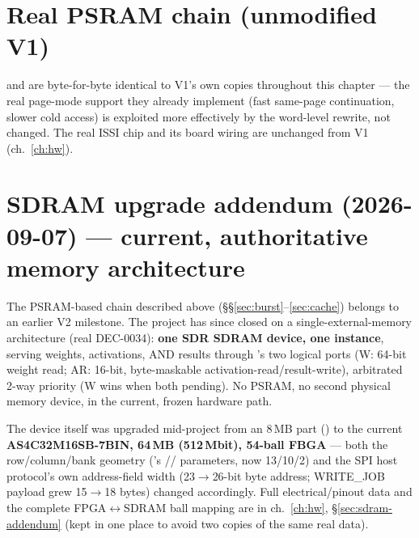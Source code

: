 \section{Real PSRAM chain (unmodified V1)}
 and  are byte-for-byte
identical to V1's own copies throughout this chapter --- the real
page-mode support they already implement (fast same-page continuation,
slower cold access) is exploited more effectively by the word-level
rewrite, not changed. The real ISSI  chip and
its board wiring are unchanged from V1 (ch.~\ref{ch:hw}).

\section{SDRAM upgrade addendum (2026-09-07) --- current, authoritative
memory architecture}
\label{sec:sdram-mem-addendum}
\begin{fnwarn}
The PSRAM-based chain described above (\S\S\ref{sec:burst}--\ref{sec:cache})
belongs to an earlier V2 milestone. The project has since closed on a
single-external-memory architecture (real  DEC-0034):
\textbf{one SDR SDRAM device, one  instance},
serving weights, activations, AND results through
's two logical ports (W: 64-bit weight
read; AR: 16-bit, byte-maskable activation-read/result-write), arbitrated
2-way priority (W wins when both pending). No PSRAM, no second physical
memory device, in the current, frozen hardware path.
\end{fnwarn}

The device itself was upgraded mid-project from an 8\,MB part
() to the current \textbf{AS4C32M16SB-7BIN,
64\,MB (512\,Mbit), 54-ball FBGA} --- both the row/column/bank geometry
('s //
 parameters, now 13/10/2) and the SPI host protocol's
own address-field width (23$\to$26-bit byte address; WRITE\_JOB payload
grew 15$\to$18 bytes) changed accordingly. Full electrical/pinout data
and the complete FPGA$\leftrightarrow$SDRAM ball mapping are in
ch.~\ref{ch:hw}, \S\ref{sec:sdram-addendum} (kept in one place to avoid
two copies of the same real data).

